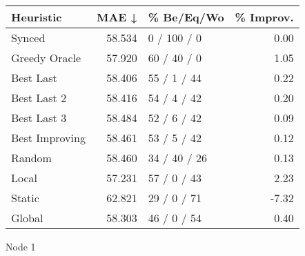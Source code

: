 \begin{tabular}{lrlr}
\toprule
\textbf{Heuristic} & \textbf{MAE ↓} & \textbf{\% Be/Eq/Wo} & \textbf{\% Improv.} \\
\midrule
            Synced &         58.534 &          0 / 100 / 0 &                0.00 \\
     Greedy Oracle &         57.920 &          60 / 40 / 0 &                1.05 \\
         Best Last &         58.406 &          55 / 1 / 44 &                0.22 \\
       Best Last 2 &         58.416 &          54 / 4 / 42 &                0.20 \\
       Best Last 3 &         58.484 &          52 / 6 / 42 &                0.09 \\
    Best Improving &         58.461 &          53 / 5 / 42 &                0.12 \\
            Random &         58.460 &         34 / 40 / 26 &                0.13 \\
             Local &         57.231 &          57 / 0 / 43 &                2.23 \\
            Static &         62.821 &          29 / 0 / 71 &               -7.32 \\
            Global &         58.303 &          46 / 0 / 54 &                0.40 \\
\bottomrule
\end{tabular}
\caption{Node 1}
\label{tab:non_lr01_le2_bs2_1}

